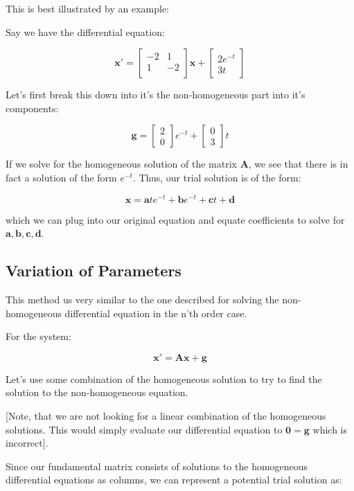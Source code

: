 \documentclass{report}
\begin{document}
This is best illustrated by an example:

Say we have the differential equation:

$$\mathbf{x}' = 
\begin{bmatrix}
    -2 & 1 \\
    1 & -2 \\
\end{bmatrix}
\mathbf{x}
+ \begin{bmatrix}
    2e^{-t} \\
    3t
\end{bmatrix}
$$

Let's first break this down into it's the non-homogeneous part into it's components:

$$\mathbf{g} = 
\begin{bmatrix}
    2 \\
    0
\end{bmatrix}
e^{-t}
+ 
\begin{bmatrix}
    0 \\
    3
\end{bmatrix}t$$

If we solve for the homogeneous solution of the matrix $\mathbf{A}$, we see that there is in fact a solution of the form $e^{-t}$. Thus, our trial solution is of the form:

$$\mathbf{x} = \mathbf{a}te^{-t} + \mathbf{b}e^{-t} + \mathbf{c}t + \mathbf{d} $$

which we can plug into our original equation and equate coefficients to solve for $\mathbf{a}, \mathbf{b}, \mathbf{c}, \mathbf{d}$.

\subsection{Variation of Parameters}

This method us very similar to the one described for solving the non-homogeneous differential equation in the n'th order case.

For the system:

$$\mathbf{x' = Ax + g}$$

Let's use some combination of the homogeneous solution to try to find the solution to the non-homogeneous equation.

[Note, that we are not looking for a linear combination of the homogeneous solutions. This would simply evaluate our differential equation to $\mathbf{0 = g}$ which is incorrect].

Since our fundamental matrix consists of solutions to the homogeneous differential equations as columns, we can represent a potential trial solution as:
\end{document}
